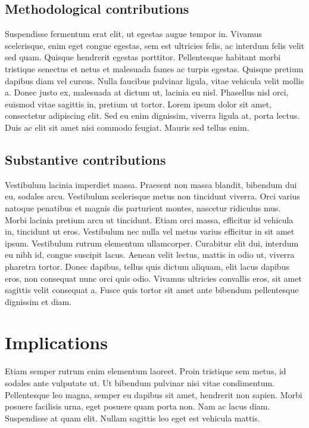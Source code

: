 \subsection{Methodological contributions}

Suspendisse fermentum erat elit, ut egestas augue tempor in. Vivamus scelerisque, enim eget congue egestas, sem est ultricies felis, ac interdum felis velit sed quam. Quisque hendrerit egestas porttitor. Pellentesque habitant morbi tristique senectus et netus et malesuada fames ac turpis egestas. Quisque pretium dapibus diam vel cursus. Nulla faucibus pulvinar ligula, vitae vehicula velit mollis a. Donec justo ex, malesuada at dictum ut, lacinia eu nisl. Phasellus nisl orci, euismod vitae sagittis in, pretium ut tortor. Lorem ipsum dolor sit amet, consectetur adipiscing elit. Sed eu enim dignissim, viverra ligula at, porta lectus. Duis ac elit sit amet nisi commodo feugiat. Mauris sed tellus enim. 

\subsection{Substantive contributions}

 Vestibulum lacinia imperdiet massa. Praesent non massa blandit, bibendum dui eu, sodales arcu. Vestibulum scelerisque metus non tincidunt viverra. Orci varius natoque penatibus et magnis dis parturient montes, nascetur ridiculus mus. Morbi lacinia pretium arcu ut tincidunt. Etiam orci massa, efficitur id vehicula in, tincidunt ut eros. Vestibulum nec nulla vel metus varius efficitur in sit amet ipsum. Vestibulum rutrum elementum ullamcorper. Curabitur elit dui, interdum eu nibh id, congue suscipit lacus. Aenean velit lectus, mattis in odio ut, viverra pharetra tortor. Donec dapibus, tellus quis dictum aliquam, elit lacus dapibus eros, non consequat nunc orci quis odio. Vivamus ultricies convallis eros, sit amet sagittis velit consequat a. Fusce quis tortor sit amet ante bibendum pellentesque dignissim et diam. 

\section{Implications}

Etiam semper rutrum enim elementum laoreet. Proin tristique sem metus, id sodales ante vulputate ut. Ut bibendum pulvinar nisi vitae condimentum. Pellentesque leo magna, semper eu dapibus sit amet, hendrerit non sapien. Morbi posuere facilisis urna, eget posuere quam porta non. Nam ac lacus diam. Suspendisse at quam elit. Nullam sagittis leo eget est vehicula mattis.


